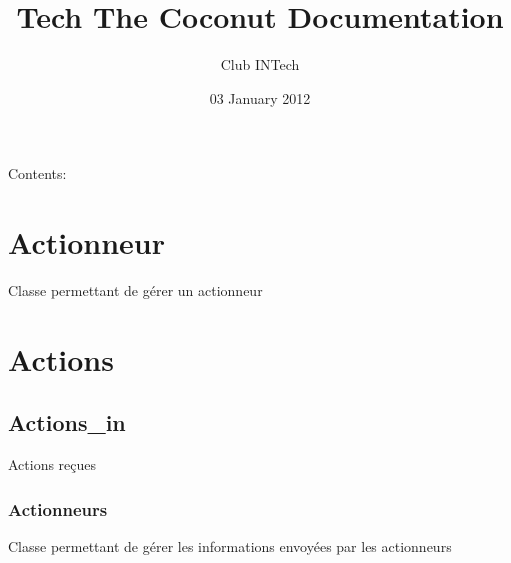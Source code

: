 \documentclass[letterpaper,10pt,french]{sphinxmanual}
\title{Tech The Coconut Documentation}
\date{03 January 2012}
\author{Club INTech}
\begin{document}
\maketitle
\tableofcontents
{}\label{index::doc}


Contents:


\chapter{Actionneur}
\label{actionneur:actionneur}\label{actionneur::doc}\label{actionneur:welcome-to-tech-the-coconut-s-documentation}\label{actionneur:module-lib.actionneur}

\begin{fulllineitems}
\label{actionneur:lib.actionneur.Actionneur}
Classe permettant de gérer un actionneur

\end{fulllineitems}



\chapter{Actions}
\label{actions::doc}\label{actions:actions}

\section{Actions\_in}
\label{actions:actions-in}
Actions reçues


\subsection{Actionneurs}
\label{actions:actionneurs}\label{actions:module-lib.actions_in.actionneurs_in}

\begin{fulllineitems}
\label{actions:lib.actions_in.actionneurs_in.Actionneurs_in}
Classe permettant de gérer les informations envoyées par les actionneurs

\end{fulllineitems}
\end{document}
